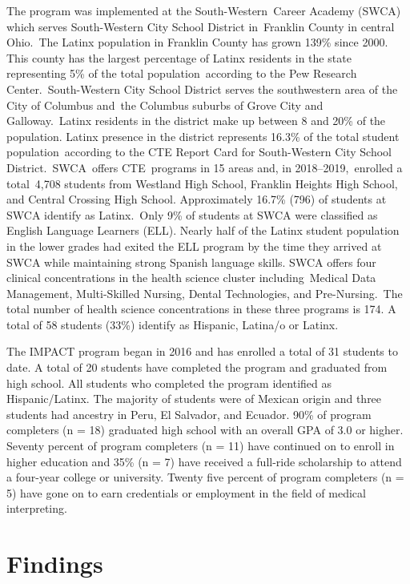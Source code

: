 \documentclass[output=paper]{langscibook}
\begin{document}
The program was implemented at the South-Western~Career Academy (SWCA) which serves South-Western City School District in~Franklin County in central Ohio.~The Latinx population in Franklin County has grown 139\% since 2000. This county has the largest percentage of Latinx residents in the state representing 5\% of the total population~according to the Pew Research Center.~South-Western City School District serves the southwestern area of the City of Columbus and~the Columbus suburbs of Grove City and Galloway.~Latinx residents in the district make up between 8 and 20\% of the population. Latinx presence in the district represents 16.3\% of the total student population~according to the  CTE Report Card for South-Western City School District.~SWCA~offers CTE~programs in 15 areas and, in 2018--2019,~enrolled a total~4,708 students from Westland High School, Franklin Heights High School, and Central Crossing High School. Approximately 16.7\% (796) of students at SWCA identify as Latinx.~Only 9\% of students at SWCA were classified as English Language Learners (ELL). Nearly half of the Latinx student population in the lower grades had exited the ELL program by the time they arrived at SWCA while maintaining strong Spanish language skills. SWCA offers four clinical concentrations in the health science cluster including~Medical Data Management, Multi-Skilled Nursing, Dental Technologies, and Pre-Nursing.~The total number of health science concentrations in these three programs is 174. A total of 58 students (33\%) identify as Hispanic, Latina/o or Latinx.

The IMPACT program began in 2016 and has enrolled a total of 31 students to date. A total of 20 students have completed the program and graduated from high school. All students who completed the program identified as Hispanic/Latinx. The majority of students were of Mexican origin and three students had ancestry in Peru, El Salvador, and Ecuador. 90\% of program completers (n = 18) graduated high school with an overall GPA of 3.0 or higher. Seventy percent of program completers (n = 11) have continued on to enroll in higher education and 35\% (n = 7) have received a full-ride scholarship to attend a four-year college or university. Twenty five percent of program completers (n = 5) have gone on to earn credentials or employment in the field of medical interpreting.

\section{Findings}
\end{document}
